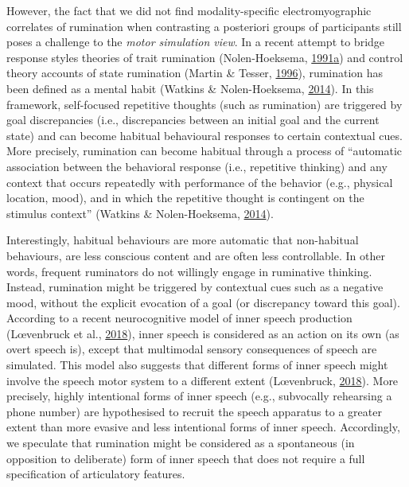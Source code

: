 \documentclass[a4paper,12pt,twoside,openright,oldfontcommands]{memoir}
\begin{document}
However, the fact that we did not find modality-specific electromyographic correlates of rumination when contrasting a posteriori groups of participants still poses a challenge to the \emph{motor simulation view}. In a recent attempt to bridge response styles theories of trait rumination (Nolen-Hoeksema, \protect\hyperlink{ref-nolen-hoeksema_responses_1991}{1991}\protect\hyperlink{ref-nolen-hoeksema_responses_1991}{a}) and control theory accounts of state rumination (Martin \& Tesser, \protect\hyperlink{ref-Martin}{1996}), rumination has been defined as a mental habit (Watkins \& Nolen-Hoeksema, \protect\hyperlink{ref-watkins_habit-goal_2014}{2014}). In this framework, self-focused repetitive thoughts (such as rumination) are triggered by goal discrepancies (i.e., discrepancies between an initial goal and the current state) and can become habitual behavioural responses to certain contextual cues. More precisely, rumination can become habitual through a process of \enquote{automatic association between the behavioral response (i.e., repetitive thinking) and any context that occurs repeatedly with performance of the behavior (e.g., physical location, mood), and in which the repetitive thought is contingent on the stimulus context} (Watkins \& Nolen-Hoeksema, \protect\hyperlink{ref-watkins_habit-goal_2014}{2014}).

Interestingly, habitual behaviours are more automatic that non-habitual behaviours, are less conscious content and are often less controllable. In other words, frequent ruminators do not willingly engage in ruminative thinking. Instead, rumination might be triggered by contextual cues such as a negative mood, without the explicit evocation of a goal (or discrepancy toward this goal). According to a recent neurocognitive model of inner speech production (Lœvenbruck et al., \protect\hyperlink{ref-loevenbruck_cognitive_2018}{2018}), inner speech is considered as an action on its own (as overt speech is), except that multimodal sensory consequences of speech are simulated. This model also suggests that different forms of inner speech might involve the speech motor system to a different extent (Lœvenbruck, \protect\hyperlink{ref-loevenbruck_what_2018}{2018}). More precisely, highly intentional forms of inner speech (e.g., subvocally rehearsing a phone number) are hypothesised to recruit the speech apparatus to a greater extent than more evasive and less intentional forms of inner speech. Accordingly, we speculate that rumination might be considered as a spontaneous (in opposition to deliberate) form of inner speech that does not require a full specification of articulatory features.
\end{document}

